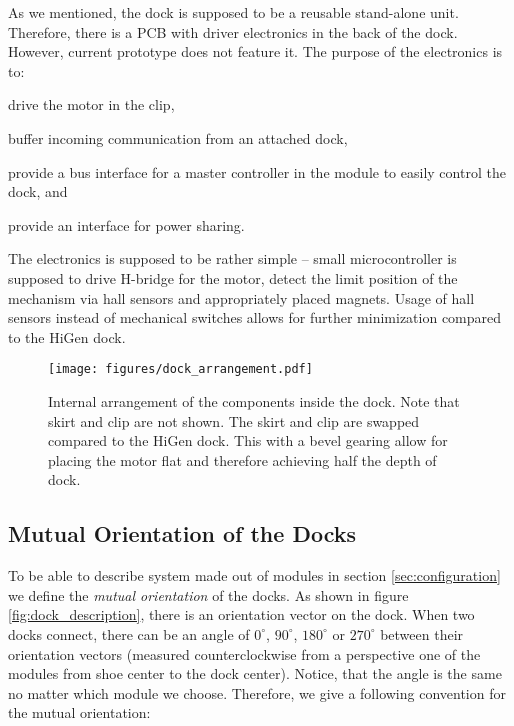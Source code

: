 As we mentioned, the dock is supposed to be a reusable stand-alone unit.
Therefore, there is a PCB with driver electronics in the back of the dock.
However, current prototype does not feature it. The purpose of the electronics
is to:
\begin{enumerate*}
    \item drive the motor in the clip,
    \item buffer incoming communication from an attached dock,
    \item provide a bus interface for a master controller in the module to
    easily control the dock, and
    \item provide an interface for power sharing.
\end{enumerate*}
The electronics is supposed to be rather simple -- small microcontroller is
supposed to drive H-bridge for the motor, detect the limit position of the
mechanism via hall sensors and appropriately placed magnets. Usage of hall
sensors instead of mechanical switches allows for further minimization compared
to the HiGen dock.

\begin{figure}[!ht]
    \centering
    \texttt{[image: figures/dock\_arrangement.pdf]}
    \caption{Internal arrangement of the components inside the dock. Note that
    skirt and clip are not shown. The skirt and clip are swapped compared to the
    HiGen dock. This with a bevel gearing allow for placing the motor flat and
    therefore achieving half the depth of dock.}
    \label{fig:dock_internal_arrangement}
\end{figure}

\subsection{Mutual Orientation of the Docks}\label{sec:mutual_orientation}

To be able to describe system made out of modules in section
\ref{sec:configuration} we define the \emph{mutual orientation} of the docks. As
shown in figure \ref{fig:dock_description}, there is an orientation vector on
the dock. When two docks connect, there can be an angle of $0^\circ$,
$90^\circ$, $180^\circ$ or $270^\circ$ between their orientation vectors
(measured counterclockwise from a perspective one of the modules from shoe
center to the dock center). Notice, that the angle is the same no matter which
module we choose. Therefore, we give a following convention for the mutual
orientation:

